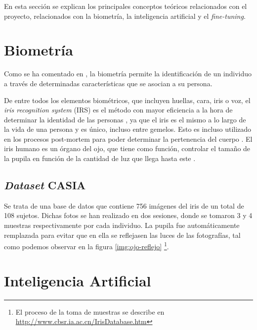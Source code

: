  \label{capitulo3}

En esta sección se explican los principales conceptos teóricos relacionados con el proyecto, relacionados con la biometría, la inteligencia
 artificial y el \textit{fine-tuning}.


\section{Biometría}

Como se ha comentado en , la biometría permite la identificación de un individuo a través de determinadas características que 
se asocian a su persona. 

De entre todos los elementos biométricos, que incluyen huellas, cara, iris o voz, el \textit{iris recognition system} (IRS) es el método con mayor eficiencia a la hora de determinar la identidad
de las personas \cite{malgheet_iris_2021}, ya que el iris es el mismo a lo largo de la vida de una persona y es único, incluso entre gemelos. Esto es incluso utilizado en los procesos 
post-mortem para poder determinar la pertenencia del cuerpo \cite{boyd_post-mortem_2020}. El iris humano es un órgano del ojo, que tiene como función, controlar el tamaño
de la pupila en función de la cantidad de luz que llega hasta este \cite{boyd_post-mortem_2020}.

\subsection{\textit{Dataset} CASIA}	\label{casia}

Se trata de una base de datos que contiene 756 imágenes del iris de un total de 108 sujetos. 
Dichas fotos se han realizado en dos sesiones, donde se tomaron 3 y 4 muestras respectivamente por cada individuo. 
La pupila fue automáticamente remplazada para evitar que en ella se reflejasen las luces de las fotografías, tal como podemos observar en la figura \ref{img:ojo-reflejo} 
\footnote{El proceso de la toma de muestras se describe en \url{http://www.cbsr.ia.ac.cn/IrisDatabase.htm}}.

\section{Inteligencia Artificial}

